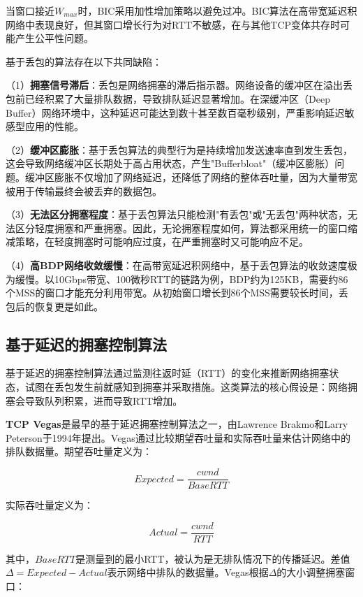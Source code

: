 当窗口接近$W_{max}$时，BIC采用加性增加策略以避免过冲。BIC算法在高带宽延迟积网络中表现良好，但其窗口增长行为对RTT不敏感，在与其他TCP变体共存时可能产生公平性问题。

基于丢包的算法存在以下共同缺陷：

（1）\textbf{拥塞信号滞后}：丢包是网络拥塞的滞后指示器。网络设备的缓冲区在溢出丢包前已经积累了大量排队数据，导致排队延迟显著增加。在深缓冲区（Deep Buffer）网络环境中，这种延迟可能达到数十甚至数百毫秒级别，严重影响延迟敏感型应用的性能。

（2）\textbf{缓冲区膨胀}：基于丢包算法的典型行为是持续增加发送速率直到发生丢包，这会导致网络缓冲区长期处于高占用状态，产生"Bufferbloat"（缓冲区膨胀）问题。缓冲区膨胀不仅增加了网络延迟，还降低了网络的整体吞吐量，因为大量带宽被用于传输最终会被丢弃的数据包。

（3）\textbf{无法区分拥塞程度}：基于丢包算法只能检测"有丢包"或"无丢包"两种状态，无法区分轻度拥塞和严重拥塞。因此，无论拥塞程度如何，算法都采用统一的窗口缩减策略，在轻度拥塞时可能响应过度，在严重拥塞时又可能响应不足。

（4）\textbf{高BDP网络收敛缓慢}：在高带宽延迟积网络中，基于丢包算法的收敛速度极为缓慢。以10Gbps带宽、100微秒RTT的链路为例，BDP约为125KB，需要约86个MSS的窗口才能充分利用带宽。从初始窗口增长到86个MSS需要较长时间，丢包后的恢复更是如此。

\subsection{基于延迟的拥塞控制算法}

基于延迟的拥塞控制算法通过监测往返时延（RTT）的变化来推断网络拥塞状态，试图在丢包发生前就感知到拥塞并采取措施。这类算法的核心假设是：网络拥塞会导致队列积累，进而导致RTT增加。

\textbf{TCP Vegas}是最早的基于延迟拥塞控制算法之一，由Lawrence Brakmo和Larry Peterson于1994年提出。Vegas通过比较期望吞吐量和实际吞吐量来估计网络中的排队数据量。期望吞吐量定义为：

\begin{equation}
Expected = \frac{cwnd}{BaseRTT}
\end{equation}

实际吞吐量定义为：

\begin{equation}
Actual = \frac{cwnd}{RTT}
\end{equation}

其中，$BaseRTT$是测量到的最小RTT，被认为是无排队情况下的传播延迟。差值$\Delta = Expected - Actual$表示网络中排队的数据量。Vegas根据$\Delta$的大小调整拥塞窗口：

